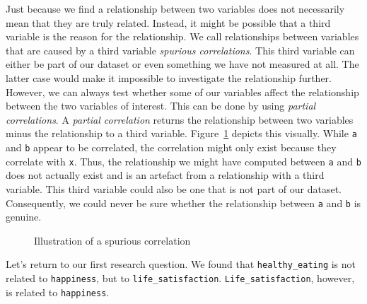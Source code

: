 \documentclass[
  letterpaper,
  DIV=11,
  numbers=noendperiod]{scrreprt}
\begin{document}
Just because we find a relationship between two variables does not
necessarily mean that they are truly related. Instead, it might be
possible that a third variable is the reason for the relationship. We
call relationships between variables that are caused by a third variable
\emph{spurious correlations}. This third variable can either be part of
our dataset or even something we have not measured at all. The latter
case would make it impossible to investigate the relationship further.
However, we can always test whether some of our variables affect the
relationship between the two variables of interest. This can be done by
using \emph{partial correlations}. A \emph{partial correlation} returns
the relationship between two variables minus the relationship to a third
variable. Figure~\ref{fig-illustration-spurious-correlation} depicts
this visually. While \texttt{a} and \texttt{b} appear to be correlated,
the correlation might only exist because they correlate with \texttt{x}.
Thus, the relationship we might have computed between \texttt{a} and
\texttt{b} does not actually exist and is an artefact from a
relationship with a third variable. This third variable could also be
one that is not part of our dataset. Consequently, we could never be
sure whether the relationship between \texttt{a} and \texttt{b} is
genuine.

\begin{figure}


\caption{\label{fig-illustration-spurious-correlation}Illustration of a
spurious correlation}

\end{figure}%

Let's return to our first research question. We found that
\texttt{healthy\_eating} is not related to \texttt{happiness}, but to
\texttt{life\_satisfaction}. \texttt{Life\_satisfaction}, however, is
related to \texttt{happiness}.
\end{document}
